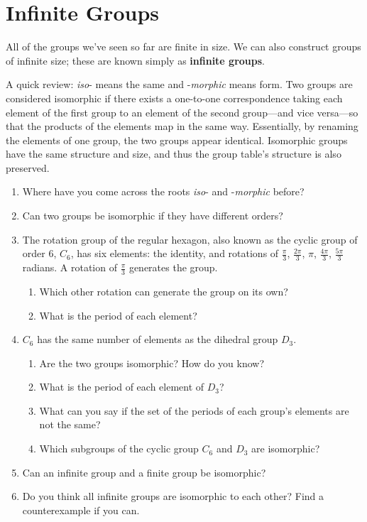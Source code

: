 \documentclass[../textbook.tex]{subfiles}
\begin{document}
\section{Infinite Groups}

All of the groups we've seen so far are finite in size. We can also construct groups of infinite size; these are known simply as \textbf{infinite groups}.

A quick review: \textit{iso}- means the same and -\textit{morphic} means form. Two groups are considered isomorphic if there exists a one-to-one correspondence taking each element of the first group to an element of the second group---and vice versa---so that the products of the elements map in the same way. Essentially, by renaming the elements of one group, the two groups appear identical. Isomorphic groups have the same structure and size, and thus the group table's structure is also preserved.

\begin{enumerate}
\item Where have you come across the roots \textit{iso}- and -\textit{morphic} before?
\item Can two groups be isomorphic if they have different orders?
\item The rotation group of the regular hexagon, also known as the cyclic group of order $6$, $C_6$, has six elements: the identity, and rotations of $\frac{\pi}{3}$, $\frac{2\pi}{3}$, $\pi$, $\frac{4\pi}{3}$, $\frac{5\pi}{3}$ radians. A rotation of $\frac{\pi}{3}$ generates the group.
\begin{enumerate}
\item Which other rotation can generate the group on its own?
\item What is the period of each element?
\end{enumerate}
\item $C_6$ has the same number of elements as the dihedral group $D_3$.
\begin{enumerate}
\item Are the two groups isomorphic? How do you know?
\item What is the period of each element of $D_3$?
\item What can you say if the set of the periods of each group's elements are not the same?
\item Which subgroups of the cyclic group $C_6$ and $D_3$ are isomorphic?
\end{enumerate}
\item Can an infinite group and a finite group be isomorphic?
\item Do you think all infinite groups are isomorphic to each other? Find a counterexample if you can.
\setcounter{problem_i}{\value{enumi}}
\end{enumerate}
\end{document}
